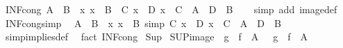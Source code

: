 \begin{isabellebody}
\ INF{\isacharunderscore}{\kern0pt}cong{\isacharcolon}{\kern0pt}\ {\isachardoublequoteopen}A\ {\isacharequal}{\kern0pt}\ B\ {\isasymLongrightarrow}\ {\isacharparenleft}{\kern0pt}{\isasymAnd}x{\isachardot}{\kern0pt}\ x\ {\isasymin}\ B\ {\isasymLongrightarrow}\ C\ x\ {\isacharequal}{\kern0pt}\ D\ x{\isacharparenright}{\kern0pt}\ {\isasymLongrightarrow}\ {\isasymSqinter}{\isacharparenleft}{\kern0pt}C\ {\isacharbackquote}{\kern0pt}\ A{\isacharparenright}{\kern0pt}\ {\isacharequal}{\kern0pt}\ {\isasymSqinter}{\isacharparenleft}{\kern0pt}D\ {\isacharbackquote}{\kern0pt}\ B{\isacharparenright}{\kern0pt}{\isachardoublequoteclose}\isanewline
%
\isadelimproof
\ \ %
\endisadelimproof
%
\isatagproof
{}\isamarkupfalse%
\ {\isacharparenleft}{\kern0pt}simp\ add{\isacharcolon}{\kern0pt}\ image{\isacharunderscore}{\kern0pt}def{\isacharparenright}{\kern0pt}%
\endisatagproof
{\isafoldproof}%
%
\isadelimproof
\isanewline
%
\endisadelimproof
\isanewline
{}\isamarkupfalse%
\ INF{\isacharunderscore}{\kern0pt}cong{\isacharunderscore}{\kern0pt}simp{\isacharcolon}{\kern0pt}\isanewline
\ \ {\isachardoublequoteopen}A\ {\isacharequal}{\kern0pt}\ B\ {\isasymLongrightarrow}\ {\isacharparenleft}{\kern0pt}{\isasymAnd}x{\isachardot}{\kern0pt}\ x\ {\isasymin}\ B\ {\isacharequal}{\kern0pt}simp{\isacharequal}{\kern0pt}{\isachargreater}{\kern0pt}\ C\ x\ {\isacharequal}{\kern0pt}\ D\ x{\isacharparenright}{\kern0pt}\ {\isasymLongrightarrow}\ {\isasymSqinter}{\isacharparenleft}{\kern0pt}C\ {\isacharbackquote}{\kern0pt}\ A{\isacharparenright}{\kern0pt}\ {\isacharequal}{\kern0pt}\ {\isasymSqinter}{\isacharparenleft}{\kern0pt}D\ {\isacharbackquote}{\kern0pt}\ B{\isacharparenright}{\kern0pt}{\isachardoublequoteclose}\isanewline
%
\isadelimproof
\ \ %
\endisadelimproof
%
\isatagproof
{}\isamarkupfalse%
\ simp{\isacharunderscore}{\kern0pt}implies{\isacharunderscore}{\kern0pt}def\ \isamarkupfalse%
\ {\isacharparenleft}{\kern0pt}fact\ INF{\isacharunderscore}{\kern0pt}cong{\isacharparenright}{\kern0pt}%
\endisatagproof
{\isafoldproof}%
%
\isadelimproof
\isanewline
%
\endisadelimproof
\isanewline
{}\isamarkupfalse%
\isanewline
\isanewline
{}\isamarkupfalse%
\ Sup\isanewline
{}\isanewline
\isanewline
{}\isamarkupfalse%
\ SUP{\isacharunderscore}{\kern0pt}image{\isacharcolon}{\kern0pt}\ {\isachardoublequoteopen}{\isasymSqunion}\ {\isacharparenleft}{\kern0pt}g\ {\isacharbackquote}{\kern0pt}\ f\ {\isacharbackquote}{\kern0pt}\ A{\isacharparenright}{\kern0pt}\ {\isacharequal}{\kern0pt}\ {\isasymSqunion}\ {\isacharparenleft}{\kern0pt}{\isacharparenleft}{\kern0pt}g\ {\isasymcirc}\ f{\isacharparenright}{\kern0pt}\ {\isacharbackquote}{\kern0pt}\ A{\isacharparenright}{\kern0pt}{\isachardoublequoteclose}\isanewline

\end{isabellebody}
